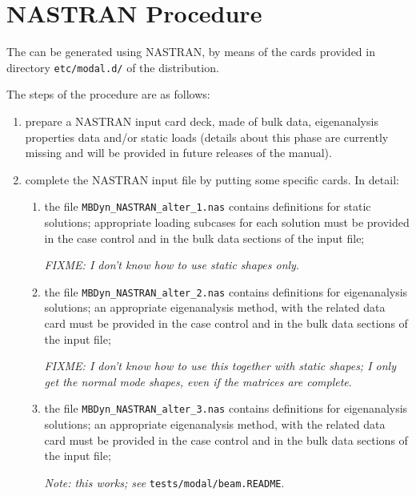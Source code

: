 \section{NASTRAN Procedure}
\label{sec:APP:EL:STRUCT:JOINT:MODAL:NASTRAN}

The  can be generated using NASTRAN,
by means of the  cards provided in directory \texttt{etc/modal.d/}
of the distribution.

The steps of the procedure are as follows:
\begin{enumerate} %

\item prepare a NASTRAN input card deck, made of bulk data,
eigenanalysis properties data and/or static loads (details about 
this phase are currently missing and will be provided in future 
releases of the manual).

\item complete the NASTRAN input file by putting some specific
 cards.
In detail:
\begin{enumerate}
\item the file \texttt{MBDyn\_NASTRAN\_alter\_1.nas} contains
	 definitions for static solutions; appropriate
	loading subcases for each solution must be provided
	in the case control and in the bulk data sections
	of the input file;

	\emph{FIXME: I don't know how to use static shapes only}.

\item the file \texttt{MBDyn\_NASTRAN\_alter\_2.nas} contains
	 definitions for eigenanalysis solutions;
	an appropriate eigenanalysis method, with the related
	data card must be provided in the case control 
	and in the bulk data sections of the input file;

	\emph{FIXME: I don't know how to use this together
		with static shapes; I only get the normal mode shapes,
		even if the matrices are complete}.

\item the file \texttt{MBDyn\_NASTRAN\_alter\_3.nas} contains
	 definitions for eigenanalysis solutions;
	an appropriate eigenanalysis method, with the related
	data card must be provided in the case control 
	and in the bulk data sections of the input file;

	\emph{Note: this works; see} \texttt{tests/modal/beam.README}.


\end{enumerate}
\end{enumerate}
